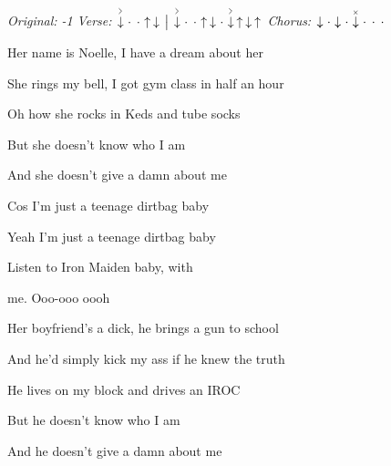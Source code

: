 \begin{song}


\begin{headerbox}
\RaiseBoxWithAccents
\textit{Original: -1} \quad
\textit{Verse:} $\AccentDown\Miss\Miss\Up\Down \Separator \AccentDown\Miss\Miss\Up\Down\Miss\AccentDown\Up\Down\Up$ \quad
\textit{Chorus:} $\Down\Miss\Down\Miss\ChuckDown\Miss\Miss\Miss$
\end{headerbox}

\begin{vchordbox}
\end{vchordbox}

\large

\bigskip

     \par

\bigskip

Her name is Noelle, I have a dream about her \par
{}She rings my bell, I got gym class in half an hour \par
{}Oh how she rocks in Keds and tube socks \par
But she doesn’t know who I am  \par
And she doesn’t give a damn about me \par

\bigskip

Cos I’m just a teenage dirtbag baby  \par
Yeah I’m just a teenage dirtbag baby  \par
{}Listen to Iron Maiden baby, with \par
{}me. Ooo-ooo oooh \par
{}    \par

\bigskip

Her boyfriend’s a dick, he brings a gun to school \par
And he’d simply kick my ass if he knew the truth \par
He lives on my block and drives an IROC \par
But he doesn’t know who I am  \par
And he doesn’t give a damn about me \par


\end{song}
